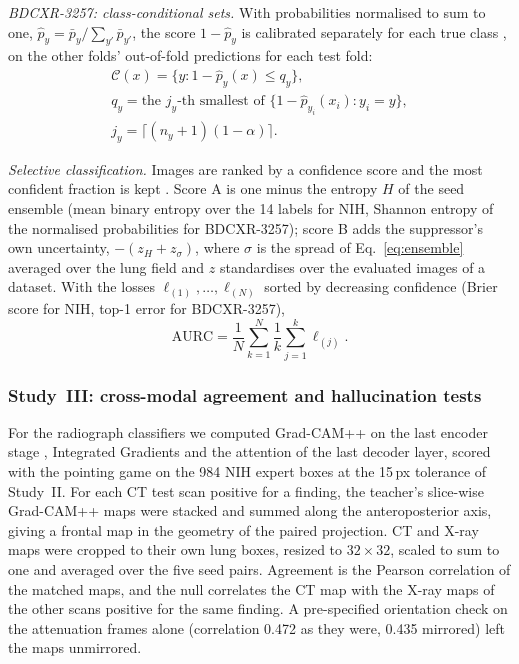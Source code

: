 \emph{BDCXR-3257: class-conditional sets.} With probabilities normalised to sum to one, $\hat p_y=\bar p_y/\sum_{y'}\bar p_{y'}$, the score
$1-\hat p_y$ is calibrated separately for each true class \cite{vovk2005algorithmic}, on the other folds' out-of-fold predictions for each
test fold:
\begin{equation}
\begin{gathered}
\mathcal{C}(x)=\{y:1-\hat p_y(x)\le q_y\},\\
q_y=\text{the }j_y\text{-th smallest of }\{1-\hat p_{y_i}(x_i):y_i=y\},\\
j_y=\lceil (n_y+1)(1-\alpha)\rceil.
\end{gathered}
\label{eq:mondriansets}
\end{equation}

\emph{Selective classification.} Images are ranked by a confidence score and the most confident fraction is kept
\cite{geifman2017selective,geifman2019bias}. Score A is one minus the entropy $H$ of the seed ensemble (mean binary entropy over the 14
labels for NIH, Shannon entropy of the normalised probabilities for BDCXR-3257); score B adds the suppressor's own uncertainty,
$-(z_H+z_\sigma)$, where $\sigma$ is the spread of Eq.~\eqref{eq:ensemble} averaged over the lung field and $z$ standardises over the
evaluated images of a dataset. With the losses $\ell_{(1)},\dots,\ell_{(N)}$ sorted by decreasing confidence (Brier score for NIH, top-1
error for BDCXR-3257),
\begin{equation}
\mathrm{AURC}=\frac1N\sum_{k=1}^{N}\frac1k\sum_{j=1}^{k}\ell_{(j)}.
\label{eq:aurc}
\end{equation}

\subsubsection{Study~III: cross-modal agreement and hallucination tests}
\label{sec:m-xmxai}
For the radiograph classifiers we computed Grad-CAM++ on the last encoder stage \cite{chattopadhay2018gradcampp}, Integrated Gradients
\cite{sundararajan2017axiomatic} and the attention of the last decoder layer, scored with the pointing game on the 984 NIH expert boxes
\cite{zhang2018topdown} at the 15\,px tolerance of Study~II. For each CT test scan positive for a finding, the teacher's slice-wise
Grad-CAM++ maps were stacked and summed along the anteroposterior axis, giving a frontal map in the geometry of the paired projection. CT and
X-ray maps were cropped to their own lung boxes, resized to $32\times32$, scaled to sum to one and averaged over the five seed pairs.
Agreement is the Pearson correlation of the matched maps, and the null correlates the CT map with the X-ray maps of the other scans positive
for the same finding. A pre-specified orientation check on the attenuation frames alone (correlation 0.472 as they were, 0.435 mirrored)
left the maps unmirrored.

